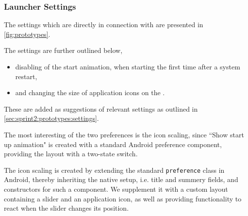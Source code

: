 \subsubsection{Launcher Settings}
The settings which are directly in connection with \launcher are presented in \cref{fig:prototypes}.

The settings are further outlined below,
\begin{itemize}
 	\item disabling of the start animation, when starting \launcher the first time after a system restart,
 	\item and changing the size of application icons on the \homeactivity.
\end{itemize} 

These are added as suggestions of relevant \launcher settings as outlined in \cref{sec:sprint2:prototypes:settings}.

The most interesting of the two preferences is the icon scaling, since ``Show start up animation" is created with a standard Android preference component, providing the layout with a two-state switch.

The icon scaling is created by extending the standard \lstinline|preference| class in Android, thereby inheriting the native setup, i.e. title and summery fields, and constructors for such a component.
We supplement it with a custom layout containing a slider and an application icon, as well as providing functionality to react when the slider changes its position.